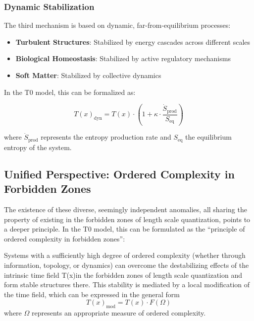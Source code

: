 \documentclass[12pt,a4paper]{article}
\newcommand{\Tfield}{T(x)}
\begin{document}
	\subsubsection{Dynamic Stabilization}
	
	The third mechanism is based on dynamic, far-from-equilibrium processes:
	
	\begin{itemize}
		\item \textbf{Turbulent Structures}: Stabilized by energy cascades across different scales
		\item \textbf{Biological Homeostasis}: Stabilized by active regulatory mechanisms
		\item \textbf{Soft Matter}: Stabilized by collective dynamics
	\end{itemize}
	
	In the T0 model, this can be formalized as:
	
	\begin{equation}
		\Tfield_{\text{dyn}} = \Tfield \cdot \left(1 + \kappa \cdot \frac{\dot{S}_{\text{prod}}}{S_{\text{eq}}}\right)
	\end{equation}
	
	where $\dot{S}_{\text{prod}}$ represents the entropy production rate and $S_{\text{eq}}$ the equilibrium entropy of the system.
	
	\subsection{Unified Perspective: Ordered Complexity in Forbidden Zones}
	
	The existence of these diverse, seemingly independent anomalies, all sharing the property of existing in the forbidden zones of length scale quantization, points to a deeper principle. In the T0 model, this can be formulated as the ``principle of ordered complexity in forbidden zones'':
	
	\begin{tcolorbox}[colback=blue!5!white,colframe=blue!75!black,title=Principle of Ordered Complexity in Forbidden Zones]
		Systems with a sufficiently high degree of ordered complexity (whether through information, topology, or dynamics) can overcome the destabilizing effects of the intrinsic time field \Tfield in the forbidden zones of length scale quantization and form stable structures there. This stability is mediated by a local modification of the time field, which can be expressed in the general form
		\begin{equation}
			\Tfield_{\text{mod}} = \Tfield \cdot F(\Omega)
		\end{equation}
		where $\Omega$ represents an appropriate measure of ordered complexity.
	\end{tcolorbox}
	
\end{document}
